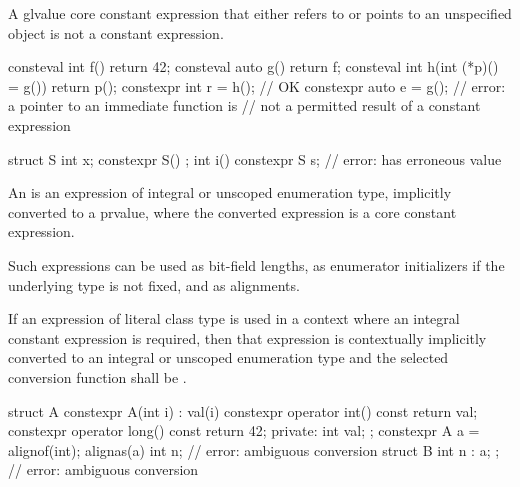 \begin{note}
A glvalue core constant expression
that either refers to or points to an unspecified object
is not a constant expression.
\end{note}
\begin{example}
\begin{codeblock}
consteval int f() { return 42; }
consteval auto g() { return f; }
consteval int h(int (*p)() = g()) { return p(); }
constexpr int r = h();                          // OK
constexpr auto e = g();                         // error: a pointer to an immediate function is
                                                // not a permitted result of a constant expression

struct S {
  int x;
  constexpr S() {}
};
int i() {
  constexpr S s;                                // error:  has erroneous value
}
\end{codeblock}
\end{example}

\pnum
An 
is an expression of integral or
unscoped enumeration type, implicitly converted to a prvalue, where the converted expression is a core constant expression.
\begin{note}
Such expressions can be
used as bit-field lengths, as enumerator
initializers if the underlying type is not fixed,
and as alignments.
\end{note}

\pnum
If an expression of literal class type is used in a context where an
integral constant expression is required, then that expression is
contextually implicitly converted to an integral or unscoped
enumeration type
and the selected conversion function shall be .
\begin{example}
\begin{codeblock}
struct A {
  constexpr A(int i) : val(i) { }
  constexpr operator int() const { return val; }
  constexpr operator long() const { return 42; }
private:
  int val;
};
constexpr A a = alignof(int);
alignas(a) int n;               // error: ambiguous conversion
struct B { int n : a; };        // error: ambiguous conversion
\end{codeblock}
\end{example}

